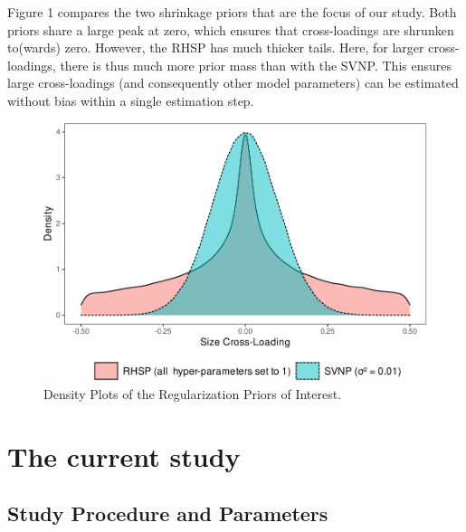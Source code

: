 \documentclass[
  man, donotrepeattitle,floatsintext]{apa6}
\begin{document}
Figure 1 compares the two shrinkage priors that are the focus of our study. Both priors share a large peak at zero, which ensures that cross-loadings are shrunken to(wards) zero. However, the RHSP has much thicker tails. Here, for larger cross-loadings, there is thus much more prior mass than with the SVNP. This ensures large cross-loadings (and consequently other model parameters) can be estimated without bias within a single estimation step.

\begin{figure}
\centering
\includegraphics{JMBKoch_thesis_files/figure-latex/unnamed-chunk-1-1.pdf}
\caption{\label{fig:unnamed-chunk-1}Density Plots of the Regularization Priors of Interest.}
\end{figure}

\hypertarget{the-current-study}{%
\section{The current study}\label{the-current-study}}

\hypertarget{study-procedure-and-parameters}{%
\subsection{Study Procedure and Parameters}\label{study-procedure-and-parameters}}
\end{document}
